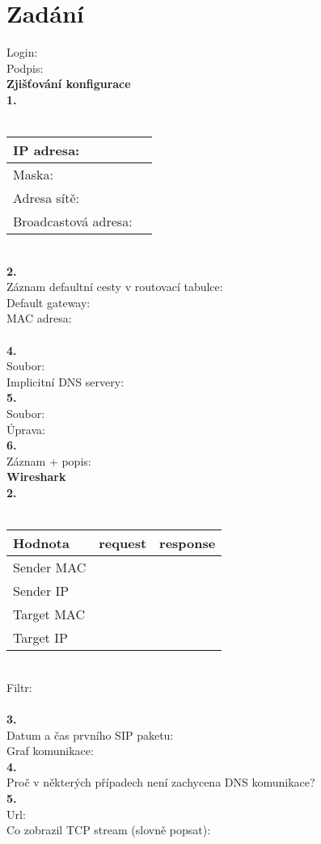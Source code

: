 \section{Zadání}
Login:\\
Podpis:\\

\textbf{Zjišťování konfigurace}\\
\textbf{1.}\\
\\
\begin{tabular}{|l|r|}
\hline
IP adresa: & \hspace{12em} \\
\hline
Maska: & \\
\hline
Adresa sítě: & \\
\hline
Broadcastová adresa: & \\
\hline
\end{tabular}
\vspace{1.5em}
\\
\textbf{2.}\\
\vspace{3em}
Záznam defaultní cesty v routovací tabulce:\\
Default gateway:\\
MAC adresa:\\
\\
\textbf{4.}\\
Soubor:\\
\vspace{8em}
Implicitní DNS servery:\\
\textbf{5.}\\
Soubor:\\
\vspace{4em}
Úprava:\\
\newpage
\noindent
\textbf{6.}\\
\vspace{5em}
Záznam + popis:\\
\noindent
\textbf{Wireshark}\\
\textbf{2.}\\
\\
\begin{tabular}{|l|c|c|}
\hline
\textbf{Hodnota} & \textbf{request} & \textbf{response}\\
\hline
Sender MAC & \hspace{10em} & \hspace{10em} \\
\hline
Sender IP & & \\
\hline
Target MAC & & \\
\hline
Target IP & & \\
\hline
\end{tabular}
\vspace{2em}
\\
Filtr:\\
\\
\textbf{3.}\\
Datum a čas prvního SIP paketu:\\
\vspace{25em}
Graf komunikace:\\
\textbf{4.}\\
\vspace{4em}
Proč v některých případech není zachycena DNS komunikace?\\
\textbf{5.}\\
Url:\\
Co zobrazil TCP stream (slovně popsat):\\
